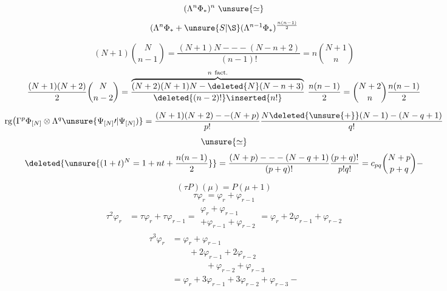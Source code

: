 
\[
(\Lambda^n\Phi_*)^n\ \unsure{\simeq}
\]
\[
(\Lambda^n\Phi_*+\unsure{S|\S}(\Lambda^{n-1}\Phi_*)^{\frac{n(n-1)}2}
\]

\[
(N+1)\binom{N}{n-1}
=\frac{(N+1)N---(N-n+2)}{(n-1)!}
=n\binom{N+1}{n}
\]
\[
\frac{(N+1)(N+2)}2\binom{N}{n-2}
=\frac{\overbrace{(N+2)(N+1)N-\deleted{N}(N-n+3)}^{n\ \text{fact.}}}
{\deleted{(n-2)!}\inserted{n!}}\ \frac{n(n-1)}2
=\binom{N+2}{n}\frac{n(n-1)}2
\]

\[
\operatorname{rg}\bigl(\Gamma^p\Phi_{[N]}\otimes\Lambda^q\unsure{\Psi_{[N]}\prime|\Psi_{[N]})}
=\frac{(N+1)(N+2)--(N+p)}{p!}
\frac{N\deleted{\unsure{+}}(N-1)-(N-q+1)}{q!}
\]
\[
\unsure{\simeq}
\]
\[
\deleted{\unsure{(1+t)^N=1+nt+\frac{n(n-1)}2}}
=\frac{(N+p)---(N-q+1)}{(p+q)!}\frac{(p+q)!}{p!q!}
=c_{pq}\binom{N+p}{p+q}-
\]

\[
(\tau P)(\mu)=P(\mu+1)
\]
\[
\tau\varphi_r=\varphi_r+\varphi_{r-1}
\]
\[
\begin{aligned}
\tau^2\varphi_r&=\tau\varphi_r+\tau\varphi_{r-1}
=\begin{gathered}\varphi_r+\varphi_{r-1}\\+\varphi_{r-1}+\varphi_{r-2}\end{gathered}
=\varphi_r+2\varphi_{r-1}+\varphi_{r-2}
\end{aligned}
\]
\[
\begin{aligned}
\tau^3\varphi_r&=\varphi_r+\varphi_{r-1}\\
&\qquad+2\varphi_{r-1}+2\varphi_{r-2}\\
&\qquad\qquad+\varphi_{r-2}+\varphi_{r-3}\\
&=\varphi_r+3\varphi_{r-1}+3\varphi_{r-2}+\varphi_{r-3}-
\end{aligned}
\]

